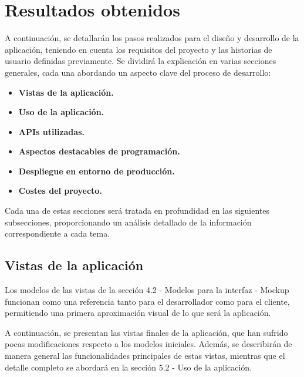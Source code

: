 

\chapter{Resultados obtenidos}\label{cap:cap5}

A continuación, se detallarán los pasos realizados para el diseño y desarrollo de la aplicación, teniendo en cuenta los requisitos del proyecto y las historias de usuario definidas previamente. Se dividirá la explicación en varias secciones generales, cada una abordando un aspecto clave del proceso de desarrollo:


\begin{itemize}
    \item \textbf{Vistas de la aplicación.}
    
    \item \textbf{Uso de la aplicación.}
    
    \item \textbf{APIs utilizadas.}

    \item \textbf{Aspectos destacables de programación.}

    \item \textbf{Despliegue en entorno de producción.}

    \item \textbf{Costes del proyecto.}
    
\end{itemize}


Cada una de estas secciones será tratada en profundidad en las siguientes subsecciones, proporcionando un análisis detallado de la información correspondiente a cada tema.

\section{Vistas de la aplicación}\label{sec:apartado}

Los modelos de las vistas de la \textcolor{naranja}{sección 4.2 - Modelos para la interfaz - Mockup}
 funcionan como una referencia tanto para el desarrollador como para el cliente, permitiendo una primera aproximación visual de lo que será la aplicación. 

\vspace{0.5cm}

A continuación, se presentan las vistas finales de la aplicación, que han sufrido pocas modificaciones respecto a los modelos iniciales. Además, se describirán de manera general las funcionalidades principales de estas vistas, mientras que el detalle completo se abordará en la  \textcolor{naranja}{sección 5.2 - Uso de la aplicación}.

